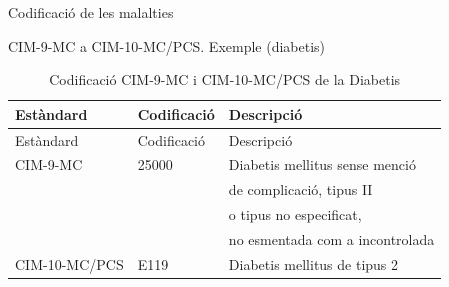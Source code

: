 \documentclass[ignorenonframetext,]{beamer}
\begin{document}
\begin{frame}{Codificació de les malalties}

\begin{block}{CIM-9-MC a CIM-10-MC/PCS. Exemple (diabetis)}

\begin{longtable}[]{@{}lll@{}}
\caption{Codificació CIM-9-MC i CIM-10-MC/PCS de la
Diabetis}\tabularnewline
\toprule
Estàndard & Codificació & Descripció\tabularnewline
\midrule
\endfirsthead
\toprule
Estàndard & Codificació & Descripció\tabularnewline
\midrule
\endhead
CIM-9-MC & 25000 & Diabetis mellitus sense menció\tabularnewline
& & de complicació, tipus II\tabularnewline
& & o tipus no especificat,\tabularnewline
& & no esmentada com a incontrolada\tabularnewline
CIM-10-MC/PCS & E119 & Diabetis mellitus de tipus 2\tabularnewline
\bottomrule
\end{longtable}

\end{block}

\end{frame}
\end{document}
